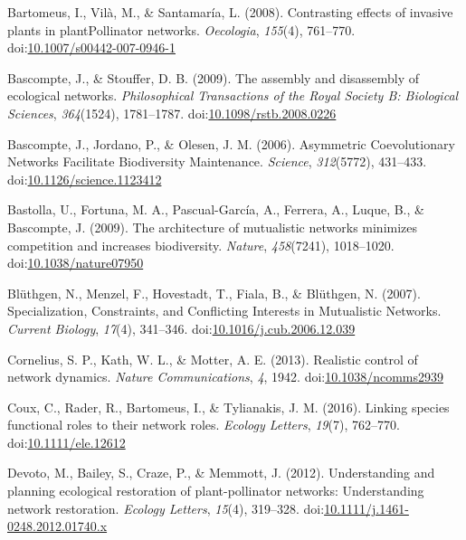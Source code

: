 \documentclass[a4paper]{artikel1}
\theoremstyle{definition}
\theoremstyle{definition}
\theoremstyle{definition}
\theoremstyle{remark}
\begin{document}
\hypertarget{ref-bartomeus_contrasting_2008-1}{}
Bartomeus, I., Vilà, M., \& Santamaría, L. (2008). Contrasting effects
of invasive plants in plantPollinator networks. \emph{Oecologia},
\emph{155}(4), 761--770.
doi:\href{https://doi.org/10.1007/s00442-007-0946-1}{10.1007/s00442-007-0946-1}

\hypertarget{ref-bascompte_assembly_2009}{}
Bascompte, J., \& Stouffer, D. B. (2009). The assembly and disassembly
of ecological networks. \emph{Philosophical Transactions of the Royal
Society B: Biological Sciences}, \emph{364}(1524), 1781--1787.
doi:\href{https://doi.org/10.1098/rstb.2008.0226}{10.1098/rstb.2008.0226}

\hypertarget{ref-bascompte_asymmetric_2006}{}
Bascompte, J., Jordano, P., \& Olesen, J. M. (2006). Asymmetric
Coevolutionary Networks Facilitate Biodiversity Maintenance.
\emph{Science}, \emph{312}(5772), 431--433.
doi:\href{https://doi.org/10.1126/science.1123412}{10.1126/science.1123412}

\hypertarget{ref-bastolla_architecture_2009}{}
Bastolla, U., Fortuna, M. A., Pascual-García, A., Ferrera, A., Luque,
B., \& Bascompte, J. (2009). The architecture of mutualistic networks
minimizes competition and increases biodiversity. \emph{Nature},
\emph{458}(7241), 1018--1020.
doi:\href{https://doi.org/10.1038/nature07950}{10.1038/nature07950}

\hypertarget{ref-bluthgen_specialization_2007}{}
Blüthgen, N., Menzel, F., Hovestadt, T., Fiala, B., \& Blüthgen, N.
(2007). Specialization, Constraints, and Conflicting Interests in
Mutualistic Networks. \emph{Current Biology}, \emph{17}(4), 341--346.
doi:\href{https://doi.org/10.1016/j.cub.2006.12.039}{10.1016/j.cub.2006.12.039}

\hypertarget{ref-cornelius_realistic_2013}{}
Cornelius, S. P., Kath, W. L., \& Motter, A. E. (2013). Realistic
control of network dynamics. \emph{Nature Communications}, \emph{4},
1942. doi:\href{https://doi.org/10.1038/ncomms2939}{10.1038/ncomms2939}

\hypertarget{ref-coux_linking_2016}{}
Coux, C., Rader, R., Bartomeus, I., \& Tylianakis, J. M. (2016). Linking
species functional roles to their network roles. \emph{Ecology Letters},
\emph{19}(7), 762--770.
doi:\href{https://doi.org/10.1111/ele.12612}{10.1111/ele.12612}

\hypertarget{ref-devoto_understanding_2012}{}
Devoto, M., Bailey, S., Craze, P., \& Memmott, J. (2012). Understanding
and planning ecological restoration of plant-pollinator networks:
Understanding network restoration. \emph{Ecology Letters}, \emph{15}(4),
319--328.
doi:\href{https://doi.org/10.1111/j.1461-0248.2012.01740.x}{10.1111/j.1461-0248.2012.01740.x}
\end{document}
